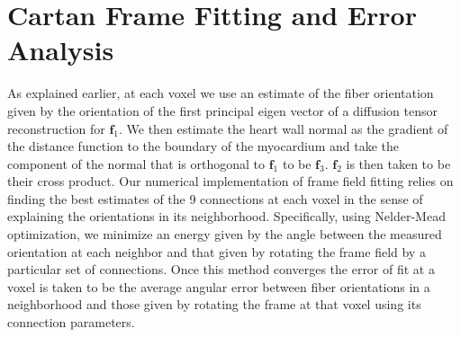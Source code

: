 \section{Cartan Frame Fitting and Error Analysis}

As explained earlier, at each voxel we use an estimate of the fiber orientation given by the orientation of the first principal eigen vector of a diffusion tensor reconstruction for $\mathbf{f}_1$. We then estimate the heart wall normal as the gradient of the distance function to the boundary of the myocardium and take the component of the normal that is orthogonal to $\mathbf{f}_1$ to be $\mathbf{f}_3$. $\mathbf{f}_2$ is then taken to be their cross product. Our numerical implementation of frame field fitting relies on finding the best estimates of the 9 connections at each voxel in the sense of explaining the orientations in its neighborhood. Specifically, using Nelder-Mead optimization, we minimize an energy given by the angle between the measured orientation at each neighbor and that given by rotating the frame field by a particular set of connections. Once this method converges the error of fit at a voxel is taken to be the average angular error between fiber orientations in a neighborhood and those given by rotating the frame at that voxel using its connection parameters.